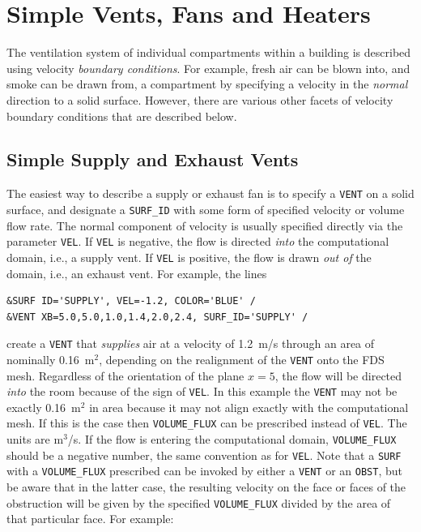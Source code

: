 \documentclass[11pt]{book}
\newcommand{\ct}{\tt\small}
\begin{document}
\section{Simple Vents, Fans and Heaters}
\label{info:Velocity_BC}

The ventilation system of individual compartments within a building is described using
velocity {\em boundary conditions}. For example, fresh air can be blown into, and smoke can
be drawn from, a compartment by specifying a velocity in the {\em normal} direction to a solid
surface. However, there are various other facets of velocity boundary conditions that are described below.

\subsection{Simple Supply and Exhaust Vents}

The easiest way to describe a supply or exhaust fan is to specify a {\ct VENT} on a solid surface, and designate
a {\ct SURF\_ID} with some form of specified velocity or volume flow rate.
The normal component of velocity is usually specified directly via the parameter
{\ct VEL}. If {\ct VEL} is negative, the flow is directed {\em into} the
computational domain, i.e., a supply vent. If {\ct VEL} is positive, the flow is drawn {\em out of} the
domain, i.e., an exhaust vent. For example, the lines

\footnotesize
\begin{verbatim}
&SURF ID='SUPPLY', VEL=-1.2, COLOR='BLUE' /
&VENT XB=5.0,5.0,1.0,1.4,2.0,2.4, SURF_ID='SUPPLY' /
\end{verbatim}
\normalsize

\noindent
create a {\ct VENT} that {\em supplies} air at a velocity of 1.2~m/s through an area of nominally 0.16~m$^2$, depending on the
realignment of the {\ct VENT} onto the FDS mesh. Regardless of the
orientation of the plane $x=5$, the flow will be directed {\em into} the room because of the sign of {\ct VEL}.
In this example the {\ct VENT} may not be exactly
0.16~m$^2$ in area because it may not align exactly with the computational mesh. If this is the case then
{\ct VOLUME\_FLUX} can be prescribed instead of {\ct VEL}. The units
are m$^3$/s. If the flow is entering the computational domain, {\ct VOLUME\_FLUX}
should be a negative number, the same convention as for {\ct VEL}. Note that a {\ct SURF}
with a {\ct VOLUME\_FLUX} prescribed can be invoked by either a
{\ct VENT} or an {\ct OBST}, but be aware that in the latter case, the resulting
velocity on the face or faces of the obstruction will be given by the specified
{\ct VOLUME\_FLUX} divided by the area of that particular face. For example:
\end{document}
